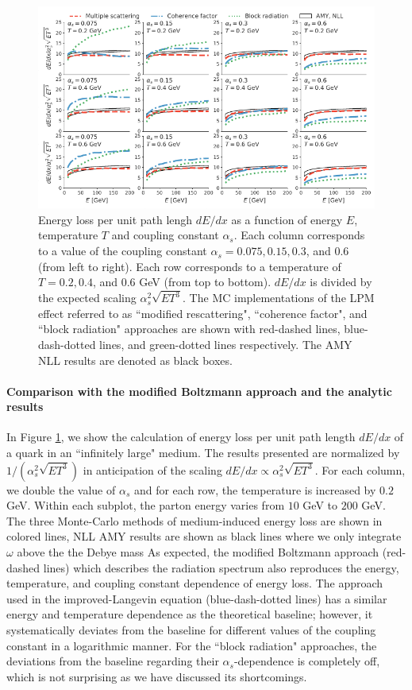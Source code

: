 \documentclass[aps, prc, reprint, amsmath, groupedaddress, nofootinbib]{revtex4-1}
\begin{document}
\begin{appendices}
\begin{figure}
\centering
\includegraphics[width=1.\textwidth]{Eloss_infinite.pdf}
\caption{Energy loss per unit path lengh $dE/dx$ as a function of energy $E$, temperature $T$ and coupling constant $\alpha_s$. Each column corresponds to a value of the coupling constant $\alpha_s = 0.075, 0.15, 0.3$, and $0.6$ (from left to right). Each row corresponds to a temperature of $T = 0.2, 0.4$, and $0.6$ GeV (from top to bottom). $dE/dx$ is divided by the expected scaling $\alpha_s^2 \sqrt{ET^3}$. The MC implementations of the LPM effect referred to as ``modified rescattering", ``coherence factor", and ``block radiation" approaches are shown with red-dashed lines, blue-dash-dotted lines, and green-dotted lines respectively. The AMY NLL results are denoted as black boxes.}
\label{fig:eloss-inf}
\end{figure}


\paragraph{Comparison with the modified Boltzmann approach and the analytic results}
In Figure \ref{fig:eloss-inf}, we show the calculation of energy loss per unit path length $dE/dx$ of a quark in an ``infinitely large" medium. 
The results presented are normalized by $1/(\alpha_s^2 \sqrt{ET^3})$ in anticipation of the scaling $dE/dx \propto \alpha_s^2 \sqrt{ET^3}$.
For each column, we double the value of $\alpha_s$ and for each row, the temperature is increased by $0.2$ GeV. 
Within each subplot, the parton energy varies from $10$ GeV to $200$ GeV.
The three Monte-Carlo methods of medium-induced energy loss are shown in colored lines, 
NLL AMY results are shown as black lines where we only integrate $\omega$ above the the Debye mass 
As expected, the modified Boltzmann approach (red-dashed lines) which describes the radiation spectrum also reproduces the energy, temperature, and coupling constant dependence of energy loss.
The  approach used in the improved-Langevin equation (blue-dash-dotted lines) has a similar energy and temperature dependence as the theoretical baseline; however, it systematically deviates from the baseline for different values of the coupling constant in a logarithmic manner.
For the ``block radiation" approaches, the deviations from the baseline regarding their $\alpha_s$-dependence is completely off, which is not surprising as we have discussed its shortcomings.

\end{appendices}
 
\end{document}
